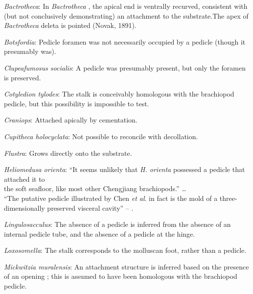 \documentclass[openany]{book}
\begin{document}
\hypertarget{Bactrotheca-coding-26}{}
\emph{Bactrotheca}: In \emph{Bactrotheca} \citep{Dzik1980Ontogenyof},
the apical end is ventrally recurved, consistent with (but not
conclusively demonstrating) an attachment to the substrate.The apex of
\emph{Bactrotheca} deleta is pointed (Novak, 1891).

\hypertarget{Botsfordia-coding-26}{}
\emph{Botsfordia}: Pedicle foramen was not necessarily occupied by a
pedicle (though it presumably was).

\hypertarget{Clupeafumosus_socialis-coding-26}{}
\emph{Clupeafumosus socialis}: A pedicle was presumably present, but
only the foramen is preserved.

\hypertarget{Cotyledion_tylodes-coding-26}{}
\emph{Cotyledion tylodes}: The stalk is conceivably homologous with the
brachiopod pedicle, but this possibility is impossible to test.

\hypertarget{Craniops-coding-26}{}
\emph{Craniops}: Attached apically by cementation.

\hypertarget{Cupitheca_holocyclata-coding-26}{}
\emph{Cupitheca holocyclata}: Not possible to reconcile with
decollation.

\hypertarget{Flustra-coding-26}{}
\emph{Flustra}: Grows directly onto the substrate.

\hypertarget{Heliomedusa_orienta-coding-26}{}
\emph{Heliomedusa orienta}: ``It seems unlikely that \emph{H. orienta}
possessed a pedicle that attached it to\\
the soft seafloor, like most other Chengjiang brachiopods.'' \ldots{}\\
``The putative pedicle illustrated by Chen \emph{et al}.
\citeyearpar[Figs 4, 6, 7]{Chen2007Reinterpretationof} in fact is the
mold of a three-dimensionally preserved visceral cavity'' --
\citet{Zhang2009Architectureand}.

\hypertarget{Lingulosacculus-coding-26}{}
\emph{Lingulosacculus}: The absence of a pedicle is inferred from the
absence of an internal pedicle tube, and the absence of a pedicle at the
hinge.

\hypertarget{Loxosomella-coding-26}{}
\emph{Loxosomella}: The stalk corresponds to the molluscan foot, rather
than a pedicle.

\hypertarget{Mickwitzia_muralensis-coding-26}{}
\emph{Mickwitzia muralensis}: An attachment structure is inferred based
on the presence of an opening \citep{Balthasar2004Shellstructure}; this
is assumed to have been homologous with the brachiopod pedicle.
\end{document}
